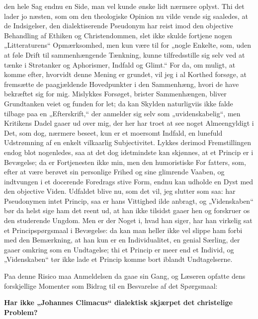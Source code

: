 den hele Sag endnu en Side, man vel kunde ønske lidt nærmere
oplyst. Thi det lader jo næsten, som om den theologiske Opinion nu
vilde vende sig saaledes, at de Indsigelser, den dialektiserende
Pseudonym har reist imod den objective Behandling af Ethiken og
Christendommen, slet ikke skulde fortjene nogen „Litteraturens“
Opmærksomhed, men kun være til for „nogle Enkelte, som, uden at
føle Drift til sammenhængende Tænkning, kunne tilfredsstille sig
selv ved at tænke i Strøtanker og Aphorismer, Indfald og Glimt.“
For da, om muligt, at komme efter, hvorvidt denne Mening er
grundet, vil jeg i al Korthed forsøge, at fremsætte de
paagjældende Hovedpunkter i den Sammenhæng, hvori de have
bekræftet sig for mig. Mislykkes Forsøget, brister Sammenhængen,
bliver Grundtanken veiet og funden for let; da kan Skylden
naturligviis ikke falde tilbage paa en „Efterskrift,“ der anmelder
sig selv som „uvidenskabelig“, men Kritikens Dadel gaaer ud over
mig, der her har troet at see noget Almeengyldigt i Det, som dog,
nærmere beseet, kun er et moersomt Indfald, en lunefuld
Udstrømning af en enkelt vilkaarlig Subjectivitet. Lykkes derimod
Fremstillingen endog blot nogenledes, saa at det dog idetmindste
kan skjønnes, at et Princip er i Bevægelse; da er Fortjenesten
ikke min, men den humoristiske For%
fatters, som, efter at være berøvet sin personlige Frihed og sine
glimrende Vaaben, og indtvungen i et docerende Foredrags stive
Form, endnu kan udholde en Dyst med den objective Viden. Udfaldet
blive nu, som det vil, jeg slutter som saa: har Pseudonymen intet
Princip, saa er hans Vittighed ilde anbragt, og „Videnskaben“ bør
da helst sige ham det reent ud, at han ikke tilsidst gaaer hen og
forskruer os den studerende Ungdom. Men er der Noget i, hvad han
siger, har han virkelig sat et Principspørgsmaal i Bevægelse: da
kan man heller ikke vel slippe ham forbi med den Bemærkning, at
han kun er en Individualitet, en genial Særling, der gaaer omkring
som en Undtagelse; thi et Princip er meer end et Individ, og
„Videnskaben“ tør ikke lade et Princip komme bort iblandt
Undtagelserne.

Paa denne Risico maa Anmeldelsen da gaae sin Gang, og Læseren
opfatte dens forskjellige Momenter som Bidrag til en Besvarelse af
det Spørgsmaal:

\begin{center}
{\large\bfseries Har ikke „Johannes Climacus“ dialektisk skjærpet
det christelige Problem?\par}
\end{center}

